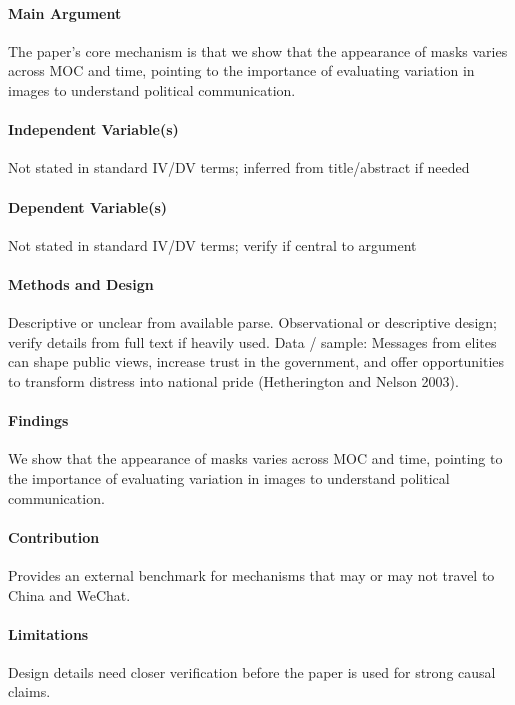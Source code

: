 \documentclass[12pt]{article}
\begin{document}
\paragraph{Main Argument} The paper's core mechanism is that we show that the appearance of masks varies across MOC and time, pointing to the importance of evaluating variation in images to understand political communication.

\paragraph{Independent Variable(s)} Not stated in standard IV/DV terms; inferred from title/abstract if needed

\paragraph{Dependent Variable(s)} Not stated in standard IV/DV terms; verify if central to argument

\paragraph{Methods and Design} Descriptive or unclear from available parse. Observational or descriptive design; verify details from full text if heavily used. Data / sample: Messages from elites can shape public views, increase trust in the government, and offer opportunities to transform distress into national pride (Hetherington and Nelson 2003).

\paragraph{Findings} We show that the appearance of masks varies across MOC and time, pointing to the importance of evaluating variation in images to understand political communication.

\paragraph{Contribution} Provides an external benchmark for mechanisms that may or may not travel to China and WeChat.

\paragraph{Limitations} Design details need closer verification before the paper is used for strong causal claims.
\end{document}
